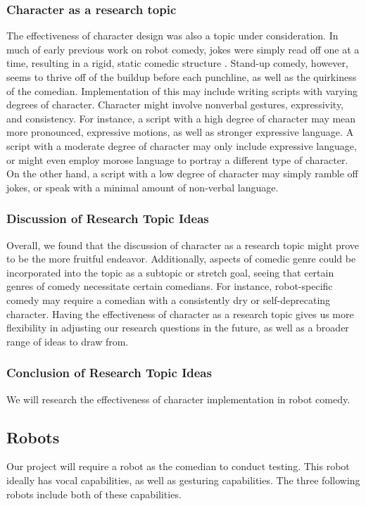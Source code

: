 \subsubsection{Character as a research topic}
The effectiveness of character design was also a topic under consideration.
In much of early previous work on robot comedy, jokes were simply read off one at a time, resulting in a rigid, static comedic structure \cite{RobotsMakeThings:2008}.
Stand-up comedy, however, seems to thrive off of the buildup before each punchline, as well as the quirkiness of the comedian.
Implementation of this may include writing scripts with varying degrees of character.
Character might involve nonverbal gestures, expressivity, and consistency.
For instance, a script with a high degree of character may mean more pronounced, expressive motions, as well as stronger expressive language.
A script with a moderate degree of character may only include expressive language, or might even employ morose language to portray a different type of character.
On the other hand, a script with a low degree of character may simply ramble off jokes, or speak with a minimal amount of non-verbal language.

\subsubsection{Discussion of Research Topic Ideas}
Overall, we found that the discussion of character as a research topic might prove to be the more fruitful endeavor.
Additionally, aspects of comedic genre could be incorporated into the topic as a subtopic or stretch goal, seeing that certain genres of comedy necessitate certain comedians.
For instance, robot-specific comedy may require a comedian with a consistently dry or self-deprecating character.
Having the effectiveness of character as a research topic gives us more flexibility in adjusting our research questions in the future, as well as a broader range of ideas to draw from.

\subsubsection{Conclusion of Research Topic Ideas}
We will research the effectiveness of character implementation in robot comedy.

\subsection{Robots}
Our project will require a robot as the comedian to conduct testing. This robot ideally has vocal capabilities, as well as gesturing capabilities. The three following robots include both of these capabilities.


